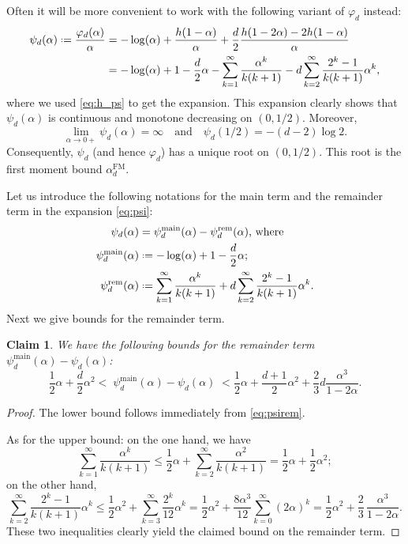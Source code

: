 \documentclass[12pt]{amsart}
\newtheorem{claim}[theorem]{Claim}
\theoremstyle{definition}
\newcommand\al{\alpha}
\newcommand\alfm{\alpha^{\mathrm{FM}}}
\newcommand\psimain{\psi^{\mathrm{main}}}
\newcommand\psirem{\psi^{\mathrm{rem}}}
\newcommand{\defeq}{\mathrel{\vcenter{\baselineskip0.5ex \lineskiplimit0pt
                     \hbox{\scriptsize.}\hbox{\scriptsize.}}}%
                     =}
\begin{document}
Often it will be more convenient to work with the following variant of $\varphi_d$ instead:
%
\begin{align}
\begin{split} \label{eq:psi}
\psi_d(\al) \defeq \frac{\varphi_d(\al)}{\al} 
&= -\log(\al) + \frac{h(1-\al)}{\al} 
+ \frac{d}{2} \frac{h(1-2\al) - 2h(1-\al)}{\al} \\
&= -\log(\al) + 1 - \frac{d}{2}\al 
- \sum_{k=1}^\infty \frac{\al^k}{k(k+1)} 
- d \sum_{k=2}^\infty \frac{2^k-1}{k(k+1)} \al^k ,
\end{split}
\end{align}
%
where we used \eqref{eq:h_ps} to get the expansion. This expansion clearly shows that $\psi_d(\al)$ is continuous and monotone decreasing on $(0,1/2)$. Moreover,
%
\[ \lim_{\al \to 0+} \psi_d(\al) = \infty 
\quad \text{and} \quad 
\psi_d(1/2) = -(d-2) \log 2 .\]
%
Consequently, $\psi_d$ (and hence $\varphi_d$) has a unique root on $(0,1/2)$. This root is the first moment bound $\alfm_d$.

Let us introduce the following notations for the main term and the remainder term in the expansion \eqref{eq:psi}:
%
\begin{align}
\psi_d(\al) &= \psimain_d(\al) - \psirem_d(\al) 
\text{, where} \nonumber\\
\psimain_d(\al) &\defeq -\log(\al) + 1 - \frac{d}{2}\al ;
\label{eq:psimain} \\
\psirem_d(\al) &\defeq 
\sum_{k=1}^\infty \frac{\al^k}{k(k+1)} 
+ d \sum_{k=2}^\infty \frac{2^k-1}{k(k+1)} \al^k .
\label{eq:psirem}
\end{align} 
%
Next we give bounds for the remainder term.
%
\begin{claim} \label{cl:remainder} 
We have the following bounds for the remainder term $\psimain_d(\al) - \psi_d(\al)$:
%
\[ \frac 12 \al + \frac{d}{2}\al^2 
< \; \psimain_d(\al) - \psi_d(\al) \;
< \frac 12 \al + \frac{d+1}{2}\al^2 
+ \frac 23 d \frac{\al^3}{1-2\al} .\]
%
\end{claim}
%
\begin{proof}
The lower bound follows immediately from \eqref{eq:psirem}.

As for the upper bound: on the one hand, we have 
%
\[ \sum_{k=1}^\infty \frac{\al^k}{k(k+1)} 
\leq \frac 12 \al
+ \sum_{k=2}^\infty \frac{\al^2}{k(k+1)} 
= \frac 12 \al + \frac 12 \al^2 ;\]
%
on the other hand, 
%
\[ \sum_{k=2}^\infty \frac{2^k-1}{k(k+1)} \al^k 
\leq \frac 12 \al^2 
+ \sum_{k=3}^\infty \frac{2^k}{12} \al^k 
= \frac 12 \al^2 
+ \frac{8 \al^3}{12} \sum_{k=0}^\infty (2\al)^k 
= \frac 12 \al^2 
+ \frac 23 \, \frac{\al^3}{1-2\al} .\]
%
These two inequalities clearly yield the claimed bound on the remainder term.
\end{proof}
%
\end{document}
